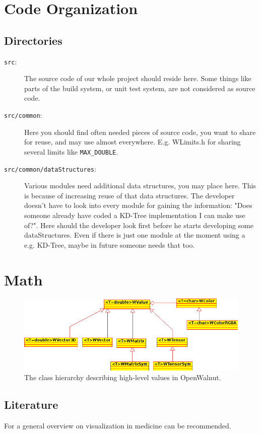 \documentclass[a4paper,12pt]{scrbook}
\begin{document}
\chapter{Code Organization}
\section{Directories}
\begin{description}
  \item[\texttt{src}:] The source code of our whole project should reside here. Some things like parts of the build system, or unit test system, are not considered as source code.
  \item[\texttt{src/common}:] Here you should find often needed pieces of source code, you want to share for reuse, and may use almost everywhere. E.g. WLimits.h for sharing several limits like \texttt{MAX\_DOUBLE}.
  \item[\texttt{src/common/dataStructures}:] Various modules need additional data structures, you may place here. This is because of increasing reuse of that data structures. The developer doesn't have to look into every module for gaining the information: "Does someone already have coded a KD-Tree implementation I can make use of?". Here should the developer look first before he starts developing some dataStructures. Even if there is just one module at the moment using a e.g. KD-Tree, maybe in future someone needs that too.
\end{description}

\chapter{Math}


\begin{figure}[htb]
  \includegraphics[width=\textwidth]{WValue_hierachy}
  \caption{The class hierarchy describing high-level values in OpenWalnut.}
\end{figure}
\section{Literature}
For a general overview on visualization in medicine \cite{Preim:2007:VMT} can be recommended.
\end{document}
